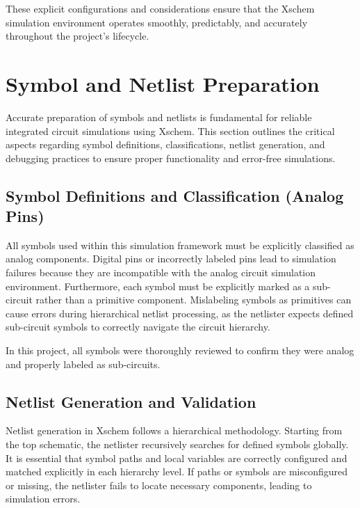 \documentclass[
  letterpaper,
]{scrbook}
\begin{document}
These explicit configurations and considerations ensure that the Xschem
simulation environment operates smoothly, predictably, and accurately
throughout the project's lifecycle.

\section{Symbol and Netlist
Preparation}\label{symbol-and-netlist-preparation}

Accurate preparation of symbols and netlists is fundamental for reliable
integrated circuit simulations using Xschem. This section outlines the
critical aspects regarding symbol definitions, classifications, netlist
generation, and debugging practices to ensure proper functionality and
error-free simulations.

\subsection{Symbol Definitions and Classification (Analog
Pins)}\label{symbol-definitions-and-classification-analog-pins}

All symbols used within this simulation framework must be explicitly
classified as analog components. Digital pins or incorrectly labeled
pins lead to simulation failures because they are incompatible with the
analog circuit simulation environment. Furthermore, each symbol must be
explicitly marked as a sub-circuit rather than a primitive component.
Mislabeling symbols as primitives can cause errors during hierarchical
netlist processing, as the netlister expects defined sub-circuit symbols
to correctly navigate the circuit hierarchy.

In this project, all symbols were thoroughly reviewed to confirm they
were analog and properly labeled as sub-circuits.

\subsection{Netlist Generation and
Validation}\label{netlist-generation-and-validation}

Netlist generation in Xschem follows a hierarchical methodology.
Starting from the top schematic, the netlister recursively searches for
defined symbols globally. It is essential that symbol paths and local
variables are correctly configured and matched explicitly in each
hierarchy level. If paths or symbols are misconfigured or missing, the
netlister fails to locate necessary components, leading to simulation
errors.
\end{document}
